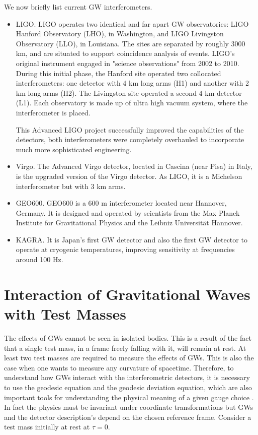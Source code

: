 \documentclass[binding=0.6cm, LaM]{sapthesis}
\begin{document}
	We now briefly list current GW interferometers.
	\begin{itemize}
        \item LIGO. LIGO operates two identical and far apart GW observatories: 
          LIGO Hanford Observatory (LHO), in Washington, and LIGO Livingston Observatory (LLO), in Louisiana.
          The sites are separated by roughly 3000 km, 
          and are situated to support coincidence analysis of events.
          LIGO's original instrument engaged in "science observations" from 2002 to 2010. 
          During this initial phase, the Hanford site operated two collocated interferometers:
          one detector with 4 km long arms (H1) and another with 2 km long arms (H2). 
          The Livingston site operated a second 4 km detector (L1). 
          Each observatory is made up of ultra high vacuum system, 
          where the interferometer is placed.

          This Advanced LIGO project successfully improved the capabilities of the detectors, 
          both interferometers were completely overhauled to incorporate much more sophisticated engineering.
        \item Virgo. The Advanced Virgo detector, located in Cascina (near Pisa) in Italy, 
          is the upgraded version of the Virgo detector. 
          As LIGO, it is a Michelson interferometer but with 3 km arms.
        \item GEO600. GEO600 is a 600 m interferometer located near Hannover,
          Germany. It is designed and operated by scientists from the
          Max Planck Institute for Gravitational Physics and the Leibniz Universität Hannover.
        \item KAGRA. It is Japan’s first GW detector and also the first GW detector to operate
          at cryogenic temperatures, improving sensitivity at frequencies around 100 Hz.
        \end{itemize}

\section{Interaction of Gravitational Waves with Test Masses}
	The effects of GWs cannot be seen in isolated bodies. 
	This is a result of the fact that a single test mass, 
	in a frame freely falling with it, will remain at rest.
	At least two test masses are required to measure the effects of GWs. 	
	This is also the case when one wants to measure any curvature of spacetime.
        Therefore, to understand how GWs interact with the interferometric detectors,
        it is necessary to use the geodesic equation and the geodesic deviation equation, which are also important tools
        for understanding the physical meaning of a given gauge choice \cite{3}. 
        In fact the physics must be invariant under coordinate transformations but GWs and the detector description's depend on the chosen reference frame.
        Consider a test mass initially at rest at $\tau = 0$.
\end{document}

